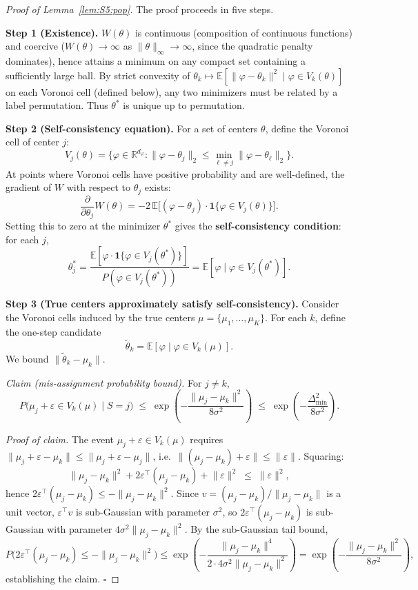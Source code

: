 \documentclass[twoside]{article}
\theoremstyle{plain}
\theoremstyle{definition}
\theoremstyle{remark}
\newcommand{\R}{\mathbb{R}}
\newcommand{\E}{\mathbb{E}}
\newcommand{\1}{\mathbf{1}}
\renewcommand{\phi}{\varphi}
\newcommand{\ttheta}{\tilde{\theta}}
\newcommand{\muk}{\mu_k}
\newcommand{\mutrue}{\{\mu_1,\dots,\mu_K\}}
\newcommand{\norm}[1]{\lVert#1\rVert}
\newcommand{\ind}{\mathbf{1}}
\begin{document}
\begin{proof}[Proof of Lemma~\ref{lem:S5:pop}]
The proof proceeds in five steps.

\noindent\textbf{Step 1 (Existence).}
$W(\theta)$ is continuous (composition of continuous functions) and
coercive ($W(\theta)\to\infty$ as $\norm{\theta}_\infty\to\infty$,
since the quadratic penalty dominates), hence attains a minimum on any
compact set containing a sufficiently large ball.  By strict convexity
of $\theta_k\mapsto\E[\norm{\phi-\theta_k}^2\mid\phi\in V_k(\theta)]$
on each Voronoi cell (defined below), any two minimizers must be related
by a label permutation.  Thus $\theta^*$ is unique up to permutation.

\noindent\textbf{Step 2 (Self-consistency equation).}
For a set of centers $\theta$, define the Voronoi cell of center $j$:
\[
V_j(\theta)=\bigl\{\phi\in\R^{d_\phi}:
\norm{\phi-\theta_j}_2\le\min_{\ell\neq j}\norm{\phi-\theta_\ell}_2\bigr\}.
\]
At points where Voronoi cells have positive probability and are
well-defined, the gradient of $W$ with respect to $\theta_j$ exists:
\[
\frac{\partial}{\partial\theta_j}W(\theta)
= -2\,\E\bigl[(\phi-\theta_j)\cdot\ind\{\phi\in V_j(\theta)\}\bigr].
\]
Setting this to zero at the minimizer $\theta^*$ gives the
\textbf{self-consistency condition}: for each $j$,
\[
\theta^*_j = \frac{\E[\phi\cdot\ind\{\phi\in V_j(\theta^*)\}]}
                 {P(\phi\in V_j(\theta^*))}
           = \E[\phi\mid\phi\in V_j(\theta^*)]. \tag{1}
\]

\noindent\textbf{Step 3 (True centers approximately satisfy self-consistency).}
Consider the Voronoi cells induced by the true centers $\mu=\mutrue$.
For each $k$, define the one-step candidate
\[
\ttheta_k = \E[\phi\mid\phi\in V_k(\mu)].
\]
We bound $\norm{\ttheta_k-\muk}$.

\noindent\textit{Claim (mis-assignment probability bound).}
For $j\neq k$,
\[
P\bigl(\mu_j+\varepsilon\in V_k(\mu)\mid S=j\bigr)
\;\le\; \exp\!\left(-\frac{\norm{\mu_j-\muk}^2}{8\sigma^2}\right)
\;\le\; \exp\!\left(-\frac{\Delta_{\min}^2}{8\sigma^2}\right).
\]

\noindent\textit{Proof of claim.}
The event $\mu_j+\varepsilon\in V_k(\mu)$ requires
$\norm{\mu_j+\varepsilon-\muk}\le\norm{\mu_j+\varepsilon-\mu_j}$, i.e.\
$\norm{(\mu_j-\muk)+\varepsilon}\le\norm{\varepsilon}$.  Squaring:
\[
\norm{\mu_j-\muk}^2 + 2\varepsilon^\top(\mu_j-\muk) + \norm{\varepsilon}^2
\;\le\; \norm{\varepsilon}^2,
\]
hence $2\varepsilon^\top(\mu_j-\muk) \le -\norm{\mu_j-\muk}^2$.
Since $v=(\mu_j-\muk)/\norm{\mu_j-\muk}$ is a unit vector,
$\varepsilon^\top v$ is sub-Gaussian with parameter $\sigma^2$, so
$2\varepsilon^\top(\mu_j-\muk)$ is sub-Gaussian with parameter
$4\sigma^2\norm{\mu_j-\muk}^2$.  By the sub-Gaussian tail bound,
\[
P\bigl(2\varepsilon^\top(\mu_j-\muk)\le -\norm{\mu_j-\muk}^2\bigr)
\le \exp\!\left(-\frac{\norm{\mu_j-\muk}^4}{2\cdot4\sigma^2\norm{\mu_j-\muk}^2}\right)
= \exp\!\left(-\frac{\norm{\mu_j-\muk}^2}{8\sigma^2}\right),
\]
establishing the claim.  $\square$


\end{proof}
\end{document}
